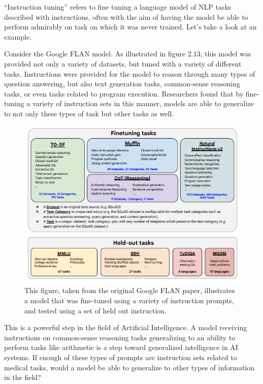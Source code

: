 “Instruction tuning” refers to fine tuning a language model of NLP tasks described with instructions, often with the aim of having the model
be able to perform admirably on task on which it was never trained. Let's take a look at an example.

Consider the Google FLAN\cite{chung2022scaling} model. As illustrated in figure 2.13, this model was provided not only a variety of datasets, but
tuned with a variety of different tasks. Instructions were provided for the model to reason through many types of question answering, but also text
generation tasks, common-sense reasoning tasks, or even tasks related to program execution. Researchers found that by fine-tuning a variety of instruction
sets in this manner, models are able to generalize to not only these types of task but other tasks as well.

\begin{figure}
  \includegraphics[width=\linewidth]{chapters/NLP/figures/flan_finetune.png}
  \caption{This figure, taken from the original Google FLAN paper, illustrates a model that was fine-tuned using a variety of instruction prompts, and tested using a set of held out instruction.}
  \label{fig:flan_instruction_fine_tuning}
\end{figure}

This is a powerful step in the field of Artificial Intelligence. A model receiving instructions on common-sense reasoning tasks generalizing to an ability to perform tasks like arithmetic is a step
toward generalized intelligence in AI systems. If enough of these types of prompts are instruction sets related to medical tasks, would a model be able to generalize to other types of information in the field?

